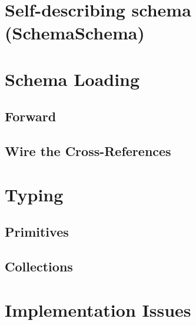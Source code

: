 \section{Self-describing schema (SchemaSchema)}\label{SchemaSchema}

\section{Schema Loading}\label{Schema Loading}

\subsection{Forward}\label{Schema Loading Forward}

\subsection{Wire the Cross-References}\label{Schema Loading Wire the Cross-References}

\section{Typing}\label{Implementation Typing}

\subsection{Primitives}\label{Typing Primitives}

\subsection{Collections}\label{Typing Collections}

\section{Implementation Issues}\label{Implementation Issues}

